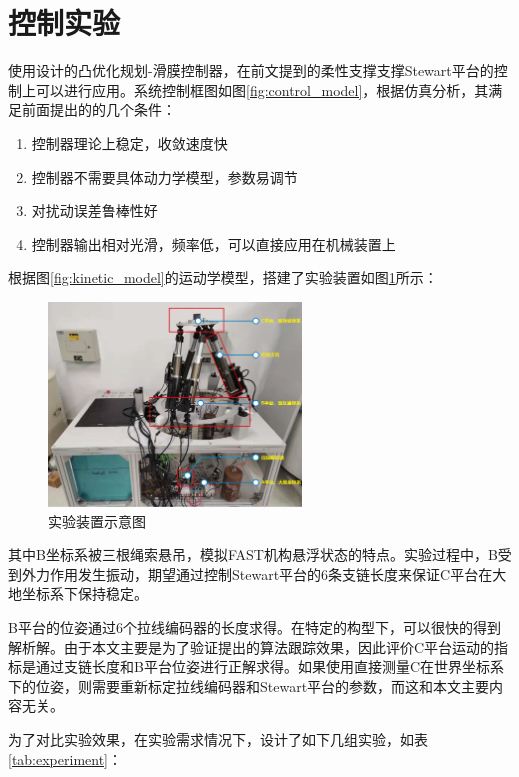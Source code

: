 \section{控制实验}

使用设计的凸优化规划-滑膜控制器，在前文提到的柔性支撑支撑Stewart平台的控制上可以进行应用。系统控制框图如图\ref{fig:control_model}，根据仿真分析，其满足前面提出的的几个条件：

\begin{enumerate}
    \item 控制器理论上稳定，收敛速度快
    \item 控制器不需要具体动力学模型，参数易调节
    \item 对扰动误差鲁棒性好
    \item 控制器输出相对光滑，频率低，可以直接应用在机械装置上
\end{enumerate}

根据图\ref{fig:kinetic_model}的运动学模型，搭建了实验装置如图\ref{fig:actual_model}所示：

\begin{figure}[H]
    \centering
    \includegraphics[width=0.6\textwidth]{imgs/actual_model.png}
    \caption{实验装置示意图}
    \label{fig:actual_model}
\end{figure}

其中B坐标系被三根绳索悬吊，模拟FAST机构悬浮状态的特点。实验过程中，B受到外力作用发生振动，期望通过控制Stewart平台的6条支链长度来保证C平台在大地坐标系下保持稳定。

B平台的位姿通过6个拉线编码器的长度求得。在特定的构型下，可以很快的得到解析解\cite{williamsCableBasedMetrologySystem2003}。由于本文主要是为了验证提出的算法跟踪效果，因此评价C平台运动的指标是通过支链长度和B平台位姿进行正解求得。如果使用直接测量C在世界坐标系下的位姿，则需要重新标定拉线编码器和Stewart平台的参数，而这和本文主要内容无关。

为了对比实验效果，在实验需求情况下，设计了如下几组实验，如表\ref{tab:experiment}：

